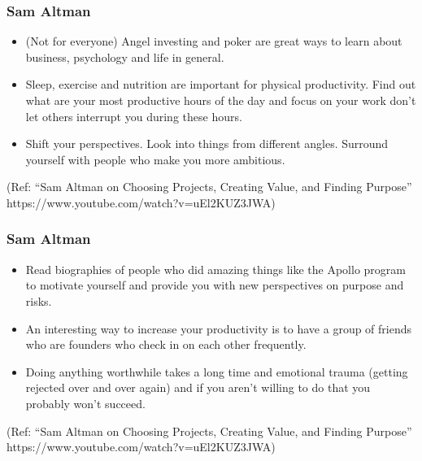 \begin{frame}[fragile]\frametitle{Sam Altman}

\begin{itemize}

\item  (Not for everyone) Angel investing and poker are great ways to learn about business, psychology and life in general.
\item  Sleep, exercise and nutrition are important for physical productivity. Find out what are your most productive hours of the day and focus on your work don't let others interrupt you during these hours.
\item Shift your perspectives. Look into things from different angles. Surround yourself with people who make you more ambitious.
\end{itemize}

{\tiny (Ref: ``Sam Altman on Choosing Projects, Creating Value, and Finding Purpose'' https://www.youtube.com/watch?v=uEl2KUZ3JWA)}
\end{frame}

\begin{frame}[fragile]\frametitle{Sam Altman}

\begin{itemize}

\item Read biographies of people who did amazing things like the Apollo program to motivate yourself and provide you with new perspectives on purpose and risks. 
\item An interesting way to increase your productivity is to have a group of friends who are founders who check in on each other frequently.
\item  Doing anything worthwhile takes a long time and emotional trauma (getting rejected over and over again) and if you aren’t willing to do that you probably won’t succeed. 
\end{itemize}

{\tiny (Ref: ``Sam Altman on Choosing Projects, Creating Value, and Finding Purpose'' https://www.youtube.com/watch?v=uEl2KUZ3JWA)}
\end{frame}


